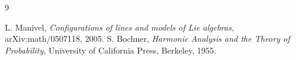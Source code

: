 \begingroup
\renewcommand{\refname}{Fuentes de la integración estructural}
\begin{thebibliography}{9}
 L. Manivel, \emph{Configurations of lines and models of Lie algebras}, arXiv:math/0507118, 2005.
 S. Bochner, \emph{Harmonic Analysis and the Theory of Probability}, University of California Press, Berkeley, 1955.
\end{thebibliography}
\endgroup
